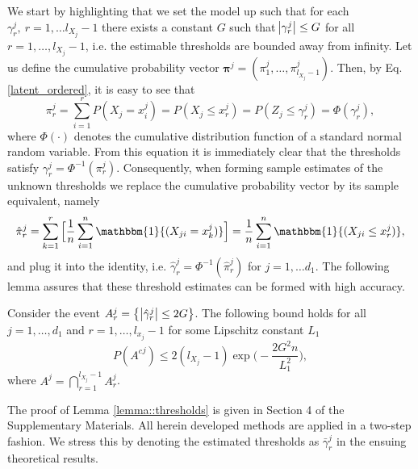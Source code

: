 We start by highlighting that we set the model up such that for each $\gamma_r^j, \ r = 1, \dots l_{X_j}-1$ there exists a constant $G$ such that $\abs{\gamma_r^j} \leq G$ for all $r = 1, \dots, l_{X_j}-1$, i.e. the estimable thresholds are bounded away from infinity. Let us define the cumulative probability vector $\boldsymbol{\pi}^j = (\pi_1^j, \dots, \pi_{l_{X_j}-1}^j)$. Then, by Eq. \eqref{latent_ordered}, it is easy to see that 
\begin{equation*}\label{thresholds_identity}
    \pi_r^j = \sum_{i=1}^r P(X_j = x_i^j)  = P(X_j \leq x_r^j) = P(Z_j \leq \gamma^j_r) = \Phi(\gamma_r^j), 
\end{equation*}
where $\Phi(\cdot)$ denotes the cumulative distribution function of a standard normal random variable. From this equation it is immediately clear that the thresholds satisfy $\gamma_r^j = \Phi^{-1}( \pi_r^j )$. Consequently, when forming sample estimates of the unknown thresholds we replace the cumulative probability vector by its sample equivalent, namely
\begin{equation*}
    \hat\pi_r^j = \sum_{k=1}^r \Big[\frac{1}{n} \sum_{i=1}^n \mathbbm{1}{(X_{ji} = x_k^j)}\Big] = \frac{1}{n} \sum_{i=1}^n \mathbbm{1}{(X_{ji} \leq x_r^j)},
\end{equation*}
and plug it into the identity, i.e. $\hat\gamma_r^j = \Phi^{-1}\left( \hat\pi_r^j \right)$ for $j = 1, \dots d_1$. The following lemma assures that these threshold estimates can be formed with high accuracy.
\begin{lemma}\label{lemma::thresholds}
    Consider the event $A_r^j = \big\{\abs{\hat{\gamma}^j_r} \leq 2G\big\}$. The following bound holds for all $j = 1, \dots, d_1$ and $r = 1, \dots, l_{x_j}-1$ for some Lipschitz constant $L_1$
    \begin{equation*}
        P\left({A^c}^j\right) \leq 2(l_{X_j}-1)\exp{\Big(- \frac{2G^2n}{L_1^2}\Big)},
    \end{equation*}
    where $A^j = \bigcap_{r=1}^{l_{X_j}-1} A_r^j$.
\end{lemma}

The proof of Lemma \ref{lemma::thresholds} is given in Section 4 %
of the Supplementary Materials. All herein developed methods are applied in a two-step fashion. 
We stress this by denoting the estimated thresholds as $\bar{\gamma}^j_r$ in the ensuing theoretical results.    

